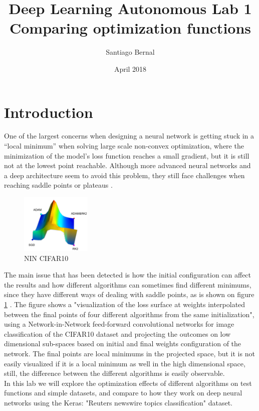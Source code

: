 \documentclass{article}
\begin{document}
\title{Deep Learning Autonomous Lab 1 \\
    \large Comparing optimization functions}

\author{Santiago Bernal }
\date{April 2018}


\maketitle
\newpage

\section{Introduction}
One of the largest concerns when designing a neural network is getting stuck in a “local minimum” when solving large scale non-convex optimization, where the  minimization of the model’s loss function reaches a small gradient, but it is still not at the lowest point reachable. Although more advanced neural networks and a deep architecture seem to avoid this problem, they still face challenges when reaching saddle points or plateaus \citep{GoodfellowV14}.

\begin{figure}
 \vspace{-10pt}
  \begin{center}
    \includegraphics[width=0.3\textwidth]{NIN_3D_sgd_adam_RK2s-300x290.png}
  \end{center}
  \caption{NIN CIFAR10}
\label{fig:nincifar10}
\end{figure}

The main issue that has been detected is how the initial configuration can affect the results and how different algorithms can sometimes find different minimums, since they have different ways of dealing with saddle points, as is shown on figure \ref{fig:nincifar10} \citep{ImTB16}. The figure shows a  "visualization of the loss surface at weights interpolated between the final points of four different algorithms from the same initialization", using a Network-in-Network feed-forward convolutional networks for image classification of the CIFAR10 dataset \cite{Krizhevsky09learningmultiple} and projecting the outcomes on low dimensional sub-spaces based on initial and final weights configuration of the network. The final points are local minimums in the projected space, but it is not easily visualized if it is a local minimum as well in the high dimensional space, still, the difference between the different algorithms is easily observable.
\\
In this lab we will explore the optimization effects of different algorithms on test functions and simple datasets, and compare to how they work on deep neural networks using the Keras: "Reuters newswire topics classification" dataset.
\end{document}
